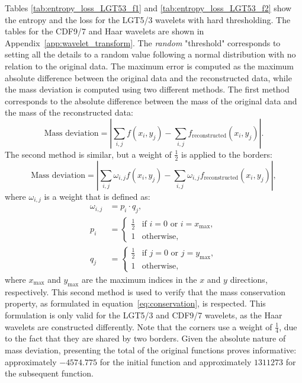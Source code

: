 


Tables \ref{tab:entropy_loss_LGT53_f1} and \ref{tab:entropy_loss_LGT53_f2} show the entropy and the loss for the LGT5/3 wavelets with hard thresholding.
The tables for the CDF9/7 and Haar wavelets are shown in Appendix~\ref{app:wavelet_transform}.
The \emph{random} "threshold" corresponds to setting all the details to a random value following a normal distribution with no relation to the original data.
The maximum error is computed as the maximum absolute difference between the original data and the reconstructed data, while the mass deviation is computed using two different methods.
The first method corresponds to the absolute difference between the mass of the original data and the mass of the reconstructed data:
\begin{equation}
    \label{eq:mass_deviation_v1}
    \text{Mass deviation} = \left| \sum_{i,j} f(x_i,y_j) - \sum_{i,j} f_{\text{reconstructed}}(x_i,y_j) \right|.
\end{equation}
The second method is similar, but a weight of $\frac{1}{2}$ is applied to the borders:
\begin{equation}
    \label{eq:mass_deviation_v2}
    \text{Mass deviation} = \left| \sum_{i,j} \omega_{i,j} f(x_i,y_j) - \sum_{i,j} \omega_{i,j} f_{\text{reconstructed}}(x_i,y_j) \right|,
\end{equation}
where $\omega_{i,j}$ is a weight that is defined as:
\begin{align}
    \omega_{i,j} &= p_i \cdot q_j, \\
    p_i &= \begin{cases}
        \frac{1}{2} & \text{if } i=0 \text{ or } i=x_{\text{max}},\\
        1 & \text{otherwise},
    \end{cases} \\
    q_j &= \begin{cases}
        \frac{1}{2} & \text{if } j=0 \text{ or } j=y_{\text{max}},\\
        1 & \text{otherwise},
    \end{cases}
\end{align}
where $x_{\text{max}}$ and $y_{\text{max}}$ are the maximum indices in the $x$ and $y$ directions, respectively.
This second method is used to verify that the mass conservation property, as formulated in equation~\ref{eq:conservation}, is respected.
This formulation is only valid for the LGT5/3 and CDF9/7 wavelets, as the Haar wavelets are constructed differently.
Note that the corners use a weight of $\frac{1}{4}$, due to the fact that they are shared by two borders.
Given the absolute nature of mass deviation, presenting the total of the original functions proves informative: approximately $-4574.775$ for the initial function and approximately $1311273$ for the subsequent function.

